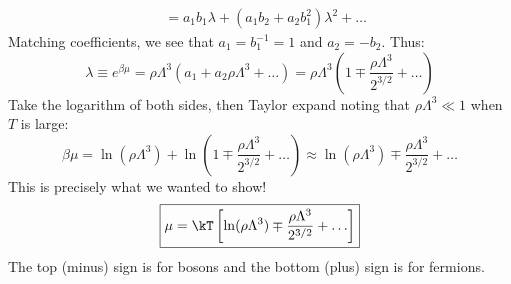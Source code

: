 {\begin{align*}
          &= a_1 b_1 \lambda + (a_1 b_2 + a_2 b_1^2) \lambda^2 + \ldots
\end{align*}
Matching coefficients, we see that
$a_1 = b_1^{-1} = 1$ and $a_2 = -b_2$. Thus:
\[ \lambda \equiv e^{\beta \mu} 
 = \rho \Lambda^3 \left( a_1 + a_2 \rho \Lambda^3 + \ldots \right) 
 = \rho \Lambda^3 \left( 1 \mp \frac{\rho \Lambda^3}{2^{3/2}} 
                      + \ldots \right) \]
Take the logarithm of both sides,
then Taylor expand noting that $\rho \Lambda^3 \ll 1$
when $T$ is large:
\[ \beta \mu 
= \ln(\rho \Lambda^3)
+ \ln(1 \mp \frac{\rho \Lambda^3}{2^{3/2}} + \ldots) \approx
  \ln(\rho \Lambda^3) \mp \frac{\rho \Lambda^3}{2^{3/2}} + \ldots \]
This is precisely what we wanted to show!
\[ \boxed{ 
   \mu = \kT \left[ 
         \ln (\rho \Lambda^3) 
     \mp \frac{\rho \Lambda^3}{2^{3/2}} 
       + \ldots \right] } \]
The top (minus) sign is for bosons
and the bottom (plus) sign is for fermions.
}

